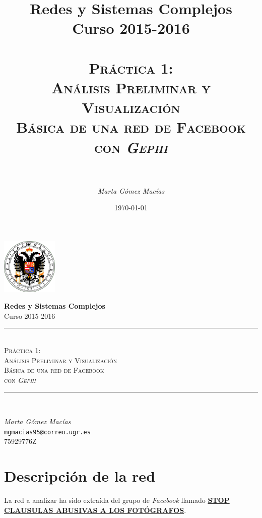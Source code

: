 \documentclass[10pt,a4paper,spanish]{article}
\title{
\normalfont \normalsize 
{\bf Redes y Sistemas Complejos} \\ Curso 2015-2016 \\ [25pt] %
\horrule{0.5pt} \\[0.4cm] %
\huge \textsc{Práctica 1: \\ Análisis Preliminar y Visualización \\ Básica de una red de Facebook \\ con \textit{Gephi}} \\ %
\horrule{2pt} \\[0.5cm] %
}
\author{\textit{Marta Gómez Macías}} %
\numberwithin{equation}{section} %
\numberwithin{figure}{section} %
\numberwithin{table}{section} %
\newcommand{\horrule}[1]{\rule{\linewidth}{#1}} %
\begin{document}
\renewcommand{\listtablename}{Índice de tablas}
\renewcommand{\tablename}{Tabla} 

\begin{titlepage}
\begin{center}
\includegraphics[width=0.2\textwidth]{ugr}

\normalfont \normalsize 
{\bf Redes y Sistemas Complejos} \\ Curso 2015-2016 \\ [25pt] %
\horrule{0.5pt} \\[0.4cm] %
{\huge \textsc{Práctica 1: \\ Análisis Preliminar y Visualización \\ Básica de una red de Facebook \\ con \textit{Gephi} \\}} %
\horrule{2pt} \\[0.5cm] %

{\Large \textit{Marta Gómez Macías} \\ \texttt{mgmacias95@correo.ugr.es} \\ 75929776Z \\[0.5cm]

\date{\today}} %
\end{center}
\end{titlepage}

\tableofcontents %



\section{Descripción de la red}

La red a analizar ha sido extraída del grupo de \textit{Facebook} llamado \href{https://www.facebook.com/groups/bastadeabusosconnuestrasfotos/}{\textbf{STOP CLAUSULAS ABUSIVAS A LOS FOTÓGRAFOS}}.

\end{document}

